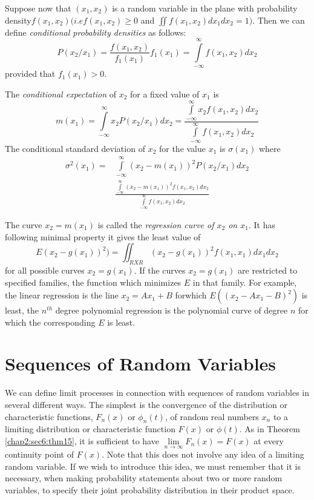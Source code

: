 Suppose now that $(x_1,x_2)$ is a random variable in the plane
with probability density$f(x_1,x_2)(i.ef(x_1,x_2)\geq 0$ and 
$\iint f(x_1,x_2)dx_1 dx_2=1)$. Then we can define \textit{conditional
  probability densities} as follows:
$$
P(x_2/x_1)=\frac{f(x_1,x_2)}{f_1(x_1)} f_1(x_1)=
\int\limits^{\infty}_{-\infty} f(x_1,x_2)dx_2
$$\pageoriginale
provided that $f_1(x_1)>0$.

The \textit{conditional expectation} of $x_2$ for a fixed value of $x_1$ is 
$$
m(x_1)=\int\limits^{\infty}_{-\infty} x_2 P(x_2/x_1)dx_2 =
\frac{\int\limits^{\infty}_{-\infty} x_2
  f(x_1,x_2)dx_2}{\int\limits^{\infty}_{-\infty} f(x_1,x_2)dx_2}
$$ 
The conditional standard deviation of $x_2$ for the value $x_1$ is $\sigma(x_1)$
where
\begin{align*}
  \sigma^2(x_1)= &\int\limits^{\infty}_{-\infty}
  (x_2-m(x_1))^2 P(x_2/x_1)dx_2\\ 
  & \frac{\int\limits^{\infty}_{-\infty} (x_2-m(x_1))^2
    f(x_1, x_2)dx_2}{\int\limits^{\infty}_{-\infty}f(x_1,x_2)dx_2}
\end{align*}

The curve $x_2=m(x_1)$ is called the \textit{regression curve of $x_2$
  on $x_1$}. 
It has following minimal property it gives the least value of 
$$
E(x_2-g(x_1))^2)={\iint_{RXR}}(x_2-g(x_1))^2 f(x_1,x_1) dx_1 dx_2
$$
for all possible curves $x_2=g(x_1)$.  If the curves $x_2=g(x_1)$ are 
restricted to specified families, the function which minimizes $E$ in 
that family. For example, the linear regression is the line $x_2=Ax_1+B$
for\pageoriginale which $E((x_2-Ax_1-B)^2)$ is least, the $n^{th}$ degree polynomial
regression is the polynomial curve of degree $n$ for which the 
corresponding $E$ is least.

\section{Sequences of Random Variables}\label{chap2:sec9} 

We can define limit processes in connection with sequences
of random variables in several different ways. The simplest is the 
convergence of the distribution or characteristic functions, $F_n(x)$
or $\phi_n(t)$, of random real numbers $x_n$ to a limiting distribution
or characteristic function $F(x)$ or $\phi(t)$.  As in
Theorem \ref{chap2:sec6:thm15}, it is 
sufficient to have $\lim\limits_{n \longrightarrow \infty}
F_n(x)=F(x)$ at every continuity point  
of $F(x)$.  Note that this does not involve any idea of a limiting random
variable. If we wish to introduce this idea, we must remember that it 
is necessary, when making probability statements about two or more
random variables, to specify their joint probability distribution in 
their product space.


